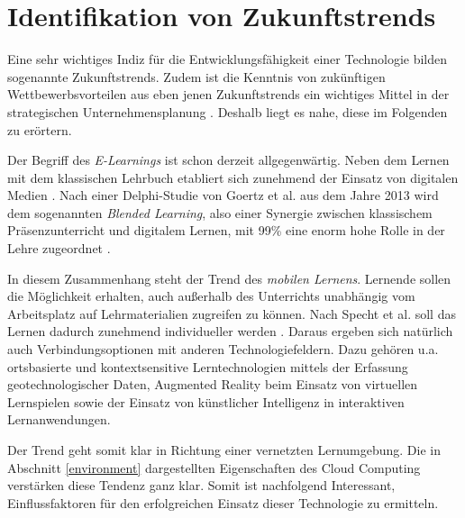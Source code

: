 \section{Identifikation von Zukunftstrends}
\label{futuretrends}

Eine sehr wichtiges Indiz für die Entwicklungsfähigkeit einer Technologie bilden sogenannte Zukunftstrends. Zudem ist die Kenntnis von zukünftigen Wettbewerbsvorteilen aus eben jenen Zukunftstrends ein wichtiges Mittel in der strategischen Unternehmensplanung \cite{mietzner}. Deshalb liegt es nahe, diese im Folgenden zu erörtern.

Der Begriff des \textit{E-Learnings} ist schon derzeit allgegenwärtig. Neben dem Lernen mit dem klassischen Lehrbuch etabliert sich zunehmend der Einsatz von digitalen Medien \cite{meinel2}. Nach einer Delphi-Studie von Goertz et al. aus dem Jahre 2013 wird dem sogenannten \textit{Blended Learning}, also einer Synergie zwischen klassischem Präsenzunterricht und digitalem Lernen, mit 99\% eine enorm hohe Rolle in der Lehre zugeordnet \cite{goertz}.

In diesem Zusammenhang steht der Trend des \textit{mobilen Lernens}. Lernende sollen die Möglichkeit erhalten, auch außerhalb des Unterrichts unabhängig vom Arbeitsplatz auf Lehrmaterialien zugreifen zu können. Nach Specht et al. soll das Lernen dadurch zunehmend individueller werden \cite{specht}. Daraus ergeben sich natürlich auch Verbindungsoptionen mit anderen Technologiefeldern. Dazu gehören u.a. ortsbasierte und kontextsensitive Lerntechnologien mittels der Erfassung geotechnologischer Daten, Augmented Reality beim Einsatz von virtuellen Lernspielen sowie der Einsatz von künstlicher Intelligenz in interaktiven Lernanwendungen.

Der Trend geht somit klar in Richtung einer vernetzten Lernumgebung. Die in Abschnitt \ref{environment} dargestellten Eigenschaften des Cloud Computing verstärken diese Tendenz ganz klar. Somit ist nachfolgend Interessant, Einflussfaktoren für den erfolgreichen Einsatz dieser Technologie zu ermitteln.